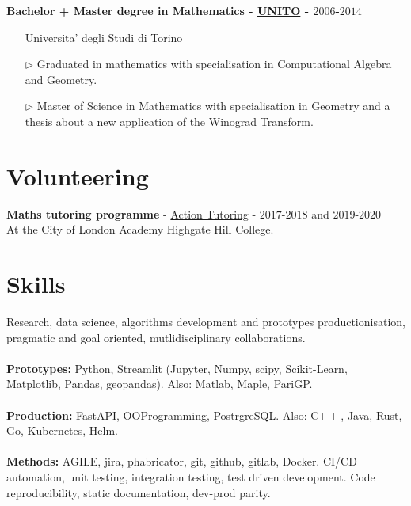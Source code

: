 \documentclass[margin,line]{resume}
\begin{document}
\begin{resume}
{\bf Bachelor + Master degree in Mathematics - \href{https://en.unito.it/}{UNITO} - $2006$-$2014$}
\vspace{0.1cm}
\begin{itemize}
    \item[] \hspace{-1.0cm} Universita' degli Studi di Torino
    \item[$\triangleright$] Graduated in mathematics with specialisation in Computational Algebra and Geometry.
    \item[$\triangleright$] Master of Science in Mathematics with specialisation in Geometry and a thesis about a new application of the Winograd Transform.
\end{itemize}


\section{\mysidestyle Volunteering}

{\bf Maths tutoring programme} -  \href{https://actiontutoring.org.uk/}{Action Tutoring} - $2017$-$2018$ and $2019$-$2020$ \\
At the City of London Academy Highgate Hill College. 

\section{\mysidestyle Skills}
Research, data science, algorithms development and prototypes productionisation, pragmatic and goal oriented, mutlidisciplinary collaborations. \\ \\ 
\textbf{Prototypes:} Python, Streamlit (Jupyter, Numpy, scipy, Scikit-Learn, Matplotlib, Pandas, geopandas). Also: Matlab, Maple, PariGP.\\ \\
\textbf{Production:} FastAPI, OOProgramming, PostrgreSQL. Also: C$++$, Java, Rust, Go, Kubernetes, Helm. \\ \\
\textbf{Methods:} AGILE, jira, phabricator, git, github, gitlab, Docker. CI/CD automation, unit testing, integration testing, test driven development. Code reproducibility, static documentation, dev-prod parity.\\ \\ 

\end{resume}
\end{document}
